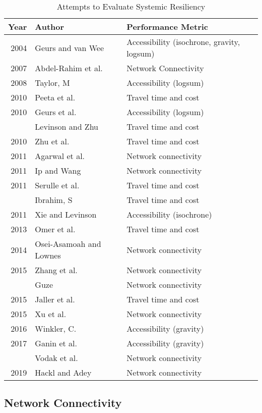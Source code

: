 \begin{table}

\caption{\label{tab:authortable}Attempts to Evaluate Systemic Resiliency}
\centering
\begin{tabular}[t]{rll}
\toprule
Year & Author & Performance Metric\\
\midrule
2004 & Geurs and van Wee & Accessibility (isochrone, gravity, logsum)\\
2007 & Abdel-Rahim et al. & Network Connectivity\\
2008 & Taylor, M & Accessibility (logsum)\\
2010 & Peeta et al. & Travel time and cost\\
2010 & Geurs et al. & Accessibility (logsum)\\
\addlinespace
2010 & Levinson and Zhu & Travel time and cost\\
2010 & Zhu et al. & Travel time and cost\\
2011 & Agarwal et al. & Network connectivity\\
2011 & Ip and Wang & Network connectivity\\
2011 & Serulle et al. & Travel time and cost\\
\addlinespace
2011 & Ibrahim, S & Travel time and cost\\
2011 & Xie and Levinson & Accessibility (isochrone)\\
2013 & Omer et al. & Travel time and cost\\
2014 & Osei-Asamoah and Lownes & Network connectivity\\
2015 & Zhang et al. & Network connectivity\\
\addlinespace
2015 & Guze & Network connectivity\\
2015 & Jaller et al. & Travel time and cost\\
2015 & Xu et al. & Network connectivity\\
2016 & Winkler, C. & Accessibility (gravity)\\
2017 & Ganin et al. & Accessibility (gravity)\\
\addlinespace
2019 & Vodak et al. & Network connectivity\\
2019 & Hackl and Adey & Network connectivity\\
\bottomrule
\end{tabular}
\end{table}

\subsection{Network Connectivity}

